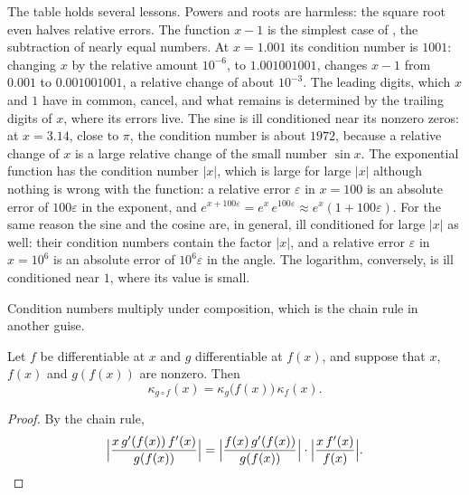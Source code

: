 The table holds several lessons. Powers and roots are harmless: the square root even halves relative errors. The function $x-1$ is the simplest case of , the subtraction of nearly equal numbers. At $x=1.001$ its condition number is $1001$: changing $x$ by the relative amount $10^{-6}$, to $1.001001001$, changes $x-1$ from $0.001$ to $0.001001001$, a relative change of about $10^{-3}$. The leading digits, which $x$ and $1$ have in common, cancel, and what remains is determined by the trailing digits of $x$, where its errors live. The sine is ill conditioned near its nonzero zeros: at $x=3.14$, close to $\pi$, the condition number is about $1972$, because a relative change of $x$ is a large relative change of the small number $\sin x$. The exponential function has the condition number $|x|$, which is large for large $|x|$ although nothing is wrong with the function: a relative error $\varepsilon$ in $x=100$ is an absolute error of $100\varepsilon$ in the exponent, and $e^{x+100\varepsilon}=e^x\,e^{100\varepsilon}\approx e^x(1+100\varepsilon)$. For the same reason the sine and the cosine are, in general, ill conditioned for large $|x|$ as well: their condition numbers contain the factor $|x|$, and a relative error $\varepsilon$ in $x=10^6$ is an absolute error of $10^6\varepsilon$ in the angle. The logarithm, conversely, is ill conditioned near $1$, where its value is small.

Condition numbers multiply under composition, which is the chain rule in another guise.

\begin{proposition}
\label{prop:condition-composition}
Let $f$ be differentiable at $x$ and $g$ differentiable at $f(x)$, and suppose that $x$, $f(x)$ and $g(f(x))$ are nonzero. Then
\[
\kappa_{g\circ f}(x)=\kappa_g\bigl(f(x)\bigr)\,\kappa_f(x).
\]
\end{proposition}

\begin{proof}
By the chain rule,
\[
\Bigl|\frac{x\,g'(f(x))\,f'(x)}{g(f(x))}\Bigr|=\Bigl|\frac{f(x)\,g'(f(x))}{g(f(x))}\Bigr|\cdot\Bigl|\frac{x\,f'(x)}{f(x)}\Bigr| .
\]
\end{proof}

